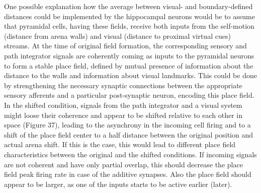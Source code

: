 One possible explanation how the average between visual- and boundary-defined distances could be implemented by the hippocampal neurons would be to assume that pyramidal cells, having these fields, receive both inputs from the self-motion (distance from arena walls) and visual (distance to proximal virtual cues) streams. At the time of original field formation, the corresponding sensory and path integrator signals are coherently coming as inputs to the pyramidal neurons to form a stable place field, defined by mutual presence of information about the distance to the walls and information about visual landmarks. This could be done by strengthening the necessary synaptic connections between the appropriate sensory afferents and a particular post-synaptic neuron, encoding this place field. In the shifted condition, signals from the path integrator and a visual system might loose their coherence and appear to be shifted relative to each other in space (Figure 37), leading to the asynchrony in the incoming cell firing and to a shift of the place field center to a half distance between the original position and actual arena shift. If this is the case, this would lead to different place field characteristics between the original and the shifted conditions. If incoming signals are not coherent and have only partial overlap, this should decrease the place field peak firing rate in case of the additive synapses. Also the place field should appear to be larger, as one of the inputs starts to be active earlier (later).

